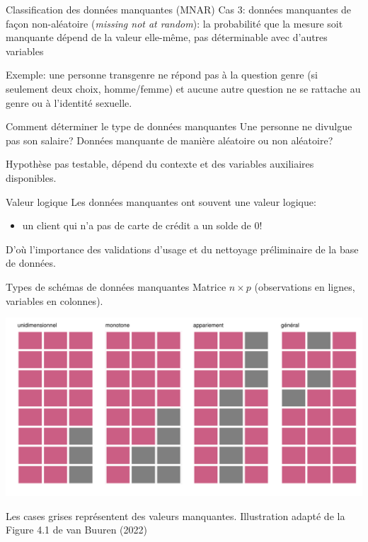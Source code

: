 \documentclass[
  ignorenonframetext,
]{beamer}
\providecommand{\tightlist}{%
  \setlength{\itemsep}{0pt}\setlength{\parskip}{0pt}}\usepackage{longtable,booktabs,array}
\begin{document}
\begin{frame}{Classification des données manquantes (MNAR)}
\protect\hypertarget{classification-des-donnuxe9es-manquantes-mnar}{}
Cas 3: données manquantes de façon non-aléatoire (\emph{missing not at
random}): la probabilité que la mesure soit manquante dépend de la
valeur elle-même, pas déterminable avec d'autres variables

Exemple: une personne transgenre ne répond pas à la question genre (si
seulement deux choix, homme/femme) et aucune autre question ne se
rattache au genre ou à l'identité sexuelle.
\end{frame}

\begin{frame}{Comment déterminer le type de données manquantes}
\protect\hypertarget{comment-duxe9terminer-le-type-de-donnuxe9es-manquantes}{}
Une personne ne divulgue pas son salaire? Données manquante de manière
aléatoire ou non aléatoire?

Hypothèse pas testable, dépend du contexte et des variables auxiliaires
disponibles.
\end{frame}

\begin{frame}{Valeur logique}
\protect\hypertarget{valeur-logique}{}
Les données manquantes ont souvent une valeur logique:

\begin{itemize}
\tightlist
\item
  un client qui n'a pas de carte de crédit a un solde de 0!
\end{itemize}

D'où l'importance des validations d'usage et du nettoyage préliminaire
de la base de données.
\end{frame}

\begin{frame}{Types de schémas de données manquantes}
\protect\hypertarget{types-de-schuxe9mas-de-donnuxe9es-manquantes}{}
Matrice \(n \times p\) (observations en lignes, variables en colonnes).

\includegraphics[width=1\textwidth,height=\textheight]{MATH60602-diapos1_files/figure-beamer/unnamed-chunk-15-1.pdf}

\footnotesize

Les cases grises représentent des valeurs manquantes. Illustration
adapté de la Figure 4.1 de van Buuren (2022)
\end{frame}
\end{document}
